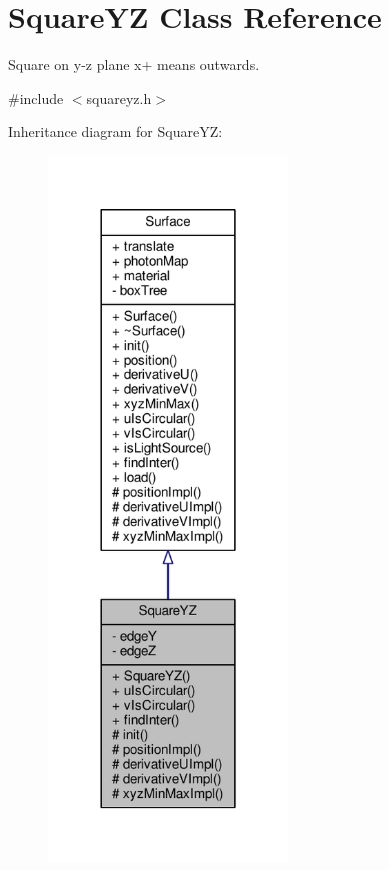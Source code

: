 \hypertarget{classSquareYZ}{}\section{Square\+YZ Class Reference}
\label{classSquareYZ}


Square on y-\/z plane x+ means outwards.  




{\ttfamily \#include $<$squareyz.\+h$>$}



Inheritance diagram for Square\+YZ\+:
\nopagebreak
\begin{figure}[H]
\begin{center}
\leavevmode
\includegraphics[width=180pt]{classSquareYZ__inherit__graph}
\end{center}
\end{figure}



